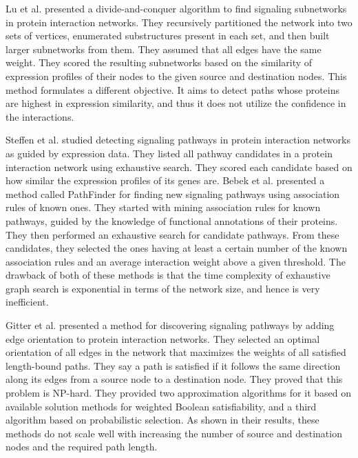 \documentclass{ws-procs11x85}
\begin{document}
Lu et al.\cite{lu} presented a divide-and-conquer algorithm to find signaling
subnetworks in protein interaction networks. They recursively partitioned the
network into two sets of vertices, enumerated substructures present in each
set, and then built larger subnetworks from them. They assumed that all edges
have the same weight. They scored the resulting subnetworks based on the
similarity of expression profiles of their nodes to the given source and
destination nodes. This method formulates a different objective. It aims to
detect paths whose proteins are highest in expression similarity, and thus it
does not utilize the confidence in the interactions.

Steffen et al.\cite{steffen} studied detecting signaling pathways in protein
interaction networks as guided by expression data. They listed all pathway
candidates in a protein interaction network using exhaustive search. They
scored each candidate based on how similar the expression profiles of its
genes are. Bebek et al.\cite{bebek} presented a method called PathFinder for
finding new signaling pathways using association rules of known ones. They
started with mining association rules for known pathways, guided by the
knowledge of functional annotations of their proteins. They then performed an
exhaustive search for candidate pathways. From these candidates, they selected
the ones having at least a certain number of the known association rules and an
average interaction weight above a given threshold. The drawback of both of
these methods is that the time complexity of exhaustive graph search is
exponential in terms of the network size, and hence is very inefficient.

Gitter et al.\cite{gitter} presented a method for discovering signaling
pathways by adding edge orientation to protein interaction networks. They
selected an optimal orientation of all edges in the network that maximizes the
weights of all satisfied length-bound paths. They say a path is satisfied if it
follows the same direction along its edges from a source node to a destination node.
They proved that this problem is NP-hard. They provided two approximation
algorithms for it based on available solution methods for weighted Boolean
satisfiability, and a third algorithm based on probabilistic selection. As
shown in their results, these methods do not scale well with increasing the
number of source and destination nodes and the required path length.
\end{document}
